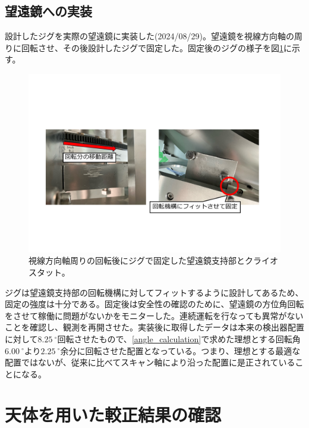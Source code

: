 \subsection{望遠鏡への実装}
設計したジグを実際の望遠鏡に実装した(2024/08/29)。望遠鏡を視線方向軸の周りに回転させ、その後設計したジグで固定した。固定後のジグの様子を図\ref{jig_install}に示す。
\begin{figure}[htbp]
  \centering
  \includegraphics[width=0.85\columnwidth]{5_alignment/figs/jig_install.pdf}
  \caption{視線方向軸周りの回転後にジグで固定した望遠鏡支持部とクライオスタット。}
  \label{jig_install}
\end{figure}
ジグは望遠鏡支持部の回転機構に対してフィットするように設計してあるため、固定の強度は十分である。固定後は安全性の確認のために、望遠鏡の方位角回転をさせて稼働に問題がないかをモニターした。連続運転を行なっても異常がないことを確認し、観測を再開させた。実装後に取得したデータは本来の検出器配置に対して$\SI{8.25}{^{\circ}}$回転させたもので、\ref{angle_calculation}で求めた理想とする回転角$\SI{6.00}{^{\circ}}$より$\SI{2.25}{^{\circ}}$余分に回転させた配置となっている。つまり、理想とする最適な配置ではないが、従来に比べてスキャン軸により沿った配置に是正されていることになる。

\section{天体を用いた較正結果の確認}

